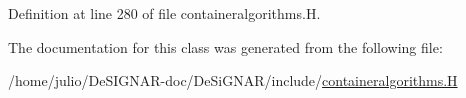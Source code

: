 Definition at line 280 of file containeralgorithms.\+H.



The documentation for this class was generated from the following file\+:\begin{DoxyCompactItemize}
\item 
/home/julio/\+De\+S\+I\+G\+N\+A\+R-\/doc/\+De\+Si\+G\+N\+A\+R/include/\hyperlink{containeralgorithms_8_h}{containeralgorithms.\+H}\end{DoxyCompactItemize}
